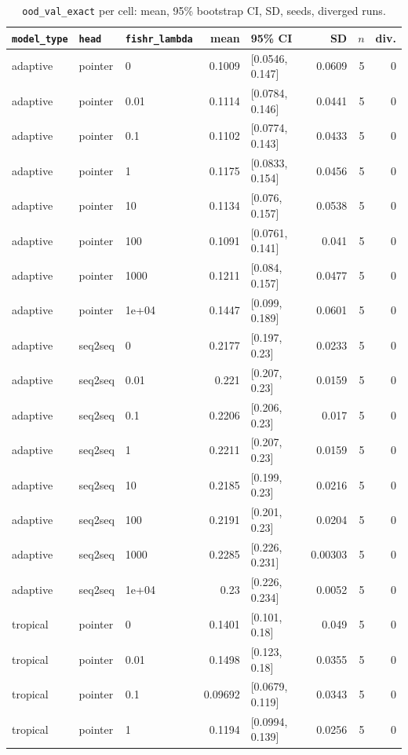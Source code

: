 \documentclass[10pt]{article}
\begin{document}
{\small
\begin{longtable}{lllrlrrr}
\caption{\texttt{ood\_val\_exact} per cell: mean, 95\% bootstrap CI, SD, seeds, diverged runs.}\label{tab:summary-ood_val_exact}\\
\toprule
\texttt{model\_type} & \texttt{head} & \texttt{fishr\_lambda} & mean & 95\% CI & SD & $n$ & div.\\
\midrule
\endhead
adaptive & pointer & 0 & 0.1009 & [0.0546, 0.147] & 0.0609 & 5 & 0\\
adaptive & pointer & 0.01 & 0.1114 & [0.0784, 0.146] & 0.0441 & 5 & 0\\
adaptive & pointer & 0.1 & 0.1102 & [0.0774, 0.143] & 0.0433 & 5 & 0\\
adaptive & pointer & 1 & 0.1175 & [0.0833, 0.154] & 0.0456 & 5 & 0\\
adaptive & pointer & 10 & 0.1134 & [0.076, 0.157] & 0.0538 & 5 & 0\\
adaptive & pointer & 100 & 0.1091 & [0.0761, 0.141] & 0.041 & 5 & 0\\
adaptive & pointer & 1000 & 0.1211 & [0.084, 0.157] & 0.0477 & 5 & 0\\
adaptive & pointer & 1e+04 & 0.1447 & [0.099, 0.189] & 0.0601 & 5 & 0\\
adaptive & seq2seq & 0 & 0.2177 & [0.197, 0.23] & 0.0233 & 5 & 0\\
adaptive & seq2seq & 0.01 & 0.221 & [0.207, 0.23] & 0.0159 & 5 & 0\\
adaptive & seq2seq & 0.1 & 0.2206 & [0.206, 0.23] & 0.017 & 5 & 0\\
adaptive & seq2seq & 1 & 0.2211 & [0.207, 0.23] & 0.0159 & 5 & 0\\
adaptive & seq2seq & 10 & 0.2185 & [0.199, 0.23] & 0.0216 & 5 & 0\\
adaptive & seq2seq & 100 & 0.2191 & [0.201, 0.23] & 0.0204 & 5 & 0\\
adaptive & seq2seq & 1000 & 0.2285 & [0.226, 0.231] & 0.00303 & 5 & 0\\
adaptive & seq2seq & 1e+04 & 0.23 & [0.226, 0.234] & 0.0052 & 5 & 0\\
tropical & pointer & 0 & 0.1401 & [0.101, 0.18] & 0.049 & 5 & 0\\
tropical & pointer & 0.01 & 0.1498 & [0.123, 0.18] & 0.0355 & 5 & 0\\
tropical & pointer & 0.1 & 0.09692 & [0.0679, 0.119] & 0.0343 & 5 & 0\\
tropical & pointer & 1 & 0.1194 & [0.0994, 0.139] & 0.0256 & 5 & 0\\

\end{longtable}}
\end{document}
